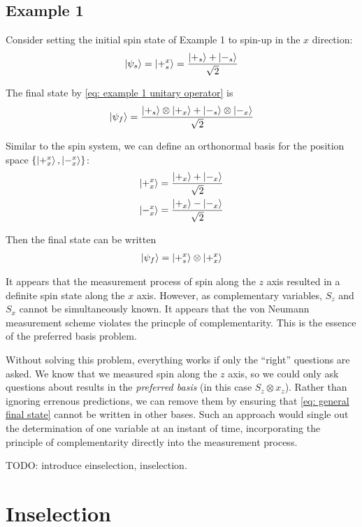 \subsection{Example 1}

Consider setting the initial spin state of Example 1 to spin-up in the $x$ direction:
\begin{align}
  \ket{\psi_s} = \ket{+^x_s} = \frac{\ket{+_s} + \ket{-_s}}{\sqrt{2}}
\end{align}

The final state by \autoref{eq: example 1 unitary operator} is
\begin{align}
  \ket{\psi_f} = \frac{\ket{+_s}\otimes\ket{+_x} + \ket{-_s}\otimes\ket{-_x}}{\sqrt{2}}
\end{align}

Similar to the spin system, we can define an orthonormal basis for the position space $\{ \ket{+^x_x}, \ket{-^x_x} \}$:
\begin{align}
  \ket{+^x_x} = \frac{\ket{+_x} + \ket{-_x}}{\sqrt{2}} \\ \nonumber
  \ket{-^x_x} = \frac{\ket{+_x} - \ket{-_x}}{\sqrt{2}}
\end{align}

Then the final state can be written
\begin{align}
  \ket{\psi_f} = \ket{+^x_s} \otimes \ket{+^x_x}
\end{align}

It appears that the measurement process of spin along the $z$ axis resulted in a definite spin state along the $x$ axis. However, as complementary variables, $S_z$ and $S_x$ cannot be simultaneously known. It appears that the von Neumann measurement scheme violates the princple of complementarity. This is the essence of the preferred basis problem.

Without solving this problem, everything works if only the ``right'' questions are asked. We know that we measured spin along the $z$ axis, so we could only ask questions about results in the \textit{preferred basis} (in this case $S_z \otimes x_z$). Rather than ignoring errenous predictions, we can remove them by ensuring that \autoref{eq: general final state} cannot be written in other bases. Such an approach would single out the determination of one variable at an instant of time, incorporating the principle of complementarity directly into the measurement process.

TODO: introduce einselection, inselection.

\section{Inselection}

